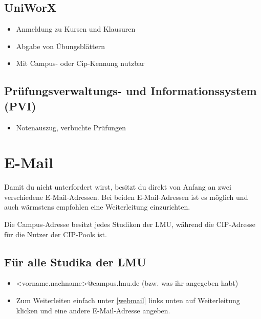 \subsection*{UniWorX\subjectList{\subjectI{}\subjectMI{}}}
\begin{itemize}
	\item Anmeldung zu Kursen und Klausuren
	\item Abgabe von Übungsblättern
	\item Mit Campus- oder Cip-Kennung nutzbar
\end{itemize}
\begin{urlList}
\end{urlList}

\subsection*{Prüfungsverwaltungs- und Informationssystem (PVI)\subjectList{\subjectI{}\subjectMI{}}}
\begin{itemize}
	\item Notenauszug, verbuchte Prüfungen
\end{itemize}
\begin{urlList}
\end{urlList}

\section{E-Mail}
Damit du nicht unterfordert wirst, besitzt du direkt von Anfang an zwei verschiedene E-Mail-Adressen. Bei beiden E-Mail-Adressen ist es möglich und auch wärmstens empfohlen eine Weiterleitung einzurichten.

Die Campus-Adresse besitzt jedes Studikon der LMU, während die CIP-Adresse für die Nutzer der CIP-Pools ist.

\subsection*{Für alle Studika der LMU}
\begin{itemize}
	\item <vorname.nachname>@campus.lmu.de (bzw. was ihr angegeben habt)
	\item Zum Weiterleiten einfach unter \ref{webmail} links unten auf Weiterleitung klicken und eine andere E-Mail-Adresse angeben.
\end{itemize}
\begin{urlList}
\end{urlList}

